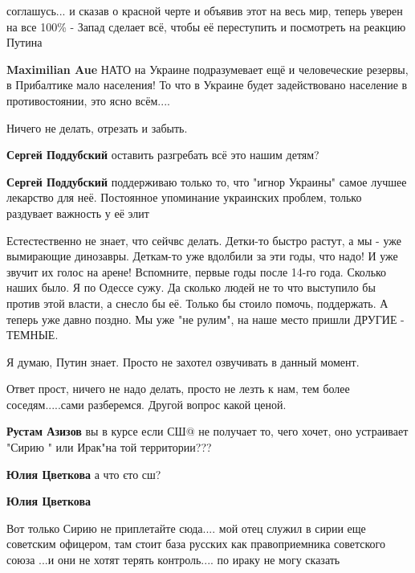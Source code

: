 \begin{itemize}
\begin{itemize}
соглашусь... и сказав о красной черте и объявив этот на весь мир, теперь уверен
на все 100\% - Запад сделает всё, чтобы её переступить и посмотреть на реакцию
Путина


\textbf{Maximilian Aue} НАТО на Украине подразумевает ещё и человеческие резервы, в Прибалтике мало населения! То что в Украине будет задействовано население в противостоянии, это ясно всём....
\end{itemize} %

Ничего не делать, отрезать и забыть.

\begin{itemize} %
\textbf{Сергей Поддубский} оставить разгребать всё это нашим детям?

\textbf{Сергей Поддубский} поддерживаю только то, что "игнор Украины" самое лучшее лекарство для неё. Постоянное упоминание украинских проблем, только раздувает важность у её элит
\end{itemize} %


\obeycr
Естестественно не знает, что сейчвс делать.
Детки-то быстро растут, а мы - уже вымирающие динозавры.
Деткам-то уже вдолбили за эти годы, что надо! И уже звучит их голос на арене!
Вспомните, первые годы после 14-го года. Сколько наших было.
Я по Одессе сужу. Да сколько людей не то что выступило бы против этой власти,
а снесло бы её. Только бы стоило помочь, поддержать.
А теперь уже давно поздно. Мы уже "не рулим", на наше место пришли ДРУГИЕ - ТЕМНЫЕ.
\restorecr

Я думаю, Путин знает. Просто не захотел озвучивать в данный момент.

Ответ прост, ничего не надо делать, просто не лезть к нам, тем более соседям.....сами разберемся. Другой вопрос какой ценой.

\begin{itemize} %
\textbf{Рустам Азизов} вы в курсе если СШ@ не получает то, чего хочет, оно устраивает "Сирию " или Ирак"на той территории???

\textbf{Юлия Цветкова} а что єто сш?

\textbf{Юлия Цветкова} 

Вот только Сирию не приплетайте сюда.... мой отец служил в сирии еще советским
офицером, там стоит база русских как правоприемника советского союза ...и они
не хотят терять контроль.... по ираку не могу сказать


\end{itemize}
\end{itemize}
